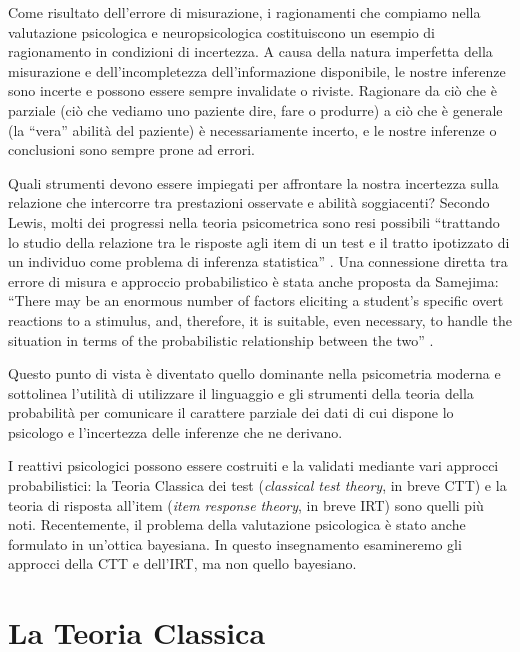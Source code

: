 \documentclass[
  11pt,
]{krantz}
\theoremstyle{definition}
\theoremstyle{definition}
\theoremstyle{definition}
\theoremstyle{definition}
\theoremstyle{remark}
\begin{document}
Come risultato dell'errore di misurazione, i ragionamenti che compiamo nella valutazione psicologica e neuropsicologica costituiscono un esempio di ragionamento in condizioni di incertezza. A causa della natura imperfetta della misurazione e dell'incompletezza dell'informazione disponibile, le nostre inferenze sono incerte e possono essere sempre invalidate o riviste. Ragionare da ciò che è parziale (ciò che vediamo uno paziente dire, fare o produrre) a ciò che è generale (la ``vera'' abilità del paziente) è necessariamente incerto, e le nostre inferenze o conclusioni sono sempre prone ad errori.

Quali strumenti devono essere impiegati per affrontare la nostra incertezza sulla relazione che intercorre tra prestazioni osservate e abilità soggiacenti? Secondo Lewis, molti dei progressi nella teoria psicometrica sono resi possibili ``trattando lo studio della relazione tra le risposte agli item di un test e il tratto ipotizzato di un individuo come problema di inferenza statistica'' \citep{lewis1986test}. Una connessione diretta tra errore di misura e approccio probabilistico è stata anche proposta da Samejima: ``There may be an enormous number of factors eliciting a student's specific overt reactions to a stimulus, and, therefore, it is suitable, even necessary, to handle the situation in terms of the probabilistic relationship between the two'' \citep{samejima1983constant}.

Questo punto di vista è diventato quello dominante nella psicometria moderna e sottolinea l'utilità di utilizzare il linguaggio e gli strumenti della teoria della probabilità per comunicare il carattere parziale dei dati di cui dispone lo psicologo e l'incertezza delle inferenze che ne derivano.

I reattivi psicologici possono essere costruiti e la validati mediante vari approcci probabilistici: la Teoria Classica dei test (\emph{classical test theory}, in breve CTT) e la teoria di risposta all'item (\emph{item response theory}, in breve IRT) sono quelli più noti. Recentemente, il problema della valutazione psicologica è stato anche formulato in un'ottica bayesiana. In questo insegnamento esamineremo gli approcci della CTT e dell'IRT, ma non quello bayesiano.

\hypertarget{la-teoria-classica}{%
\section{La Teoria Classica}\label{la-teoria-classica}}
\end{document}
